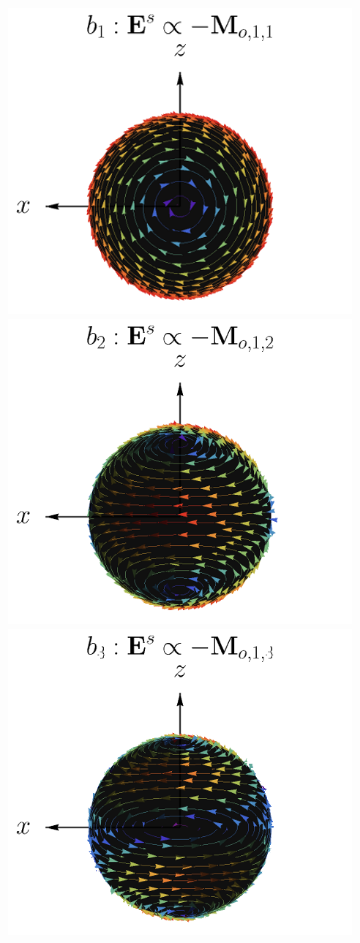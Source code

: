 \begin{figure}[h!]
		\begin{subfigure}{.9\linewidth}			
		\includegraphics[scale=.25]{1-Teoria/figs/Mo11_static_crop.png}%
		\includegraphics[scale=.25]{1-Teoria/figs/Mo12_static_crop.png}%
		\includegraphics[scale=.25]{1-Teoria/figs/Mo13_static_crop.png}%

\end{subfigure}
\end{figure}
